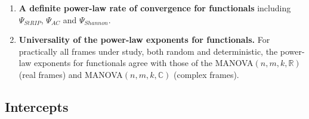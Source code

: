 \documentclass[a4paper,12pt]{article}
\newcommand{\R}{\ensuremath{\mathbb{R}}}
\newcommand{\C}{\ensuremath{\mathbb{C}}}
\newcommand{\m}{m}
\newcommand{\specstat}{\ensuremath{\Psi}}
\begin{document}
\begin{enumerate}
	\item {\bf A definite power-law rate of convergence for
		functionals} including $\specstat_{StRIP}$, $\specstat_{AC}$ and 
	$\specstat_{Shannon}$.
    
	\item {\bf Universality of the power-law exponents for functionals.} 
	For practically all frames under study, both random and deterministic, 
	the power-law exponents for functionals agree with those of the 
	MANOVA$(n,\m,k,\R)$  (real frames) and 
	MANOVA$(n,\m,k,\C)$ (complex frames).







\end{enumerate}
\subsection*{Intercepts}
\end{document}
